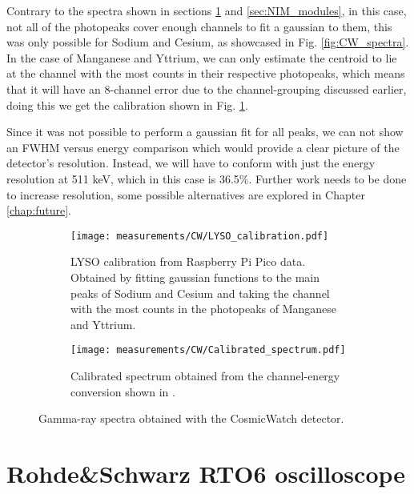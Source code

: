 Contrary to the spectra shown in sections \ref{sec:RTO6} and \ref{sec:NIM_modules}, in this case, not all of the photopeaks cover enough channels to fit a gaussian to them, this was only possible for Sodium and Cesium, as showcased in Fig. \ref{fig:CW_spectra}. In the case of Manganese and Yttrium, we can only estimate the centroid to lie at the channel with the most counts in their respective photopeaks, which means that it will have an 8-channel error due to the channel-grouping discussed earlier, doing this we get the calibration shown in Fig. \ref{sfig:CW_LYSO_calibration}.

Since it was not possible to perform a gaussian fit for all peaks, we can not show an FWHM versus energy comparison which would provide a clear picture of the detector's resolution. Instead, we will have to conform with just the energy resolution at 511 keV, which in this case is 36.5$\%$. Further work needs to be done to increase resolution, some possible alternatives are explored in Chapter \ref{chap:future}.

\begin{figure}
  \begin{subfigure}[t]{\textwidth}
    \centering
    \texttt{[image: measurements/CW/LYSO\_calibration.pdf]}
    \caption{\label{sfig:CW_LYSO_calibration}LYSO calibration from Raspberry Pi Pico data. Obtained by fitting gaussian functions to the main peaks of Sodium and Cesium and taking the channel with the most counts in the photopeaks of Manganese and Yttrium.}
  \end{subfigure}
  \medskip
  \begin{subfigure}[t]{\textwidth}
    \centering
    \texttt{[image: measurements/CW/Calibrated\_spectrum.pdf]}
    \caption{\label{sfig:CW_joint_spectra}Calibrated spectrum obtained from the channel-energy conversion shown in .}
  \end{subfigure}
  \caption{\label{fig:RS_low_peaks_calibration}Gamma-ray spectra obtained with the CosmicWatch detector.}
\end{figure}

\section{Rohde\&Schwarz RTO6 oscilloscope}\label{sec:RTO6}

